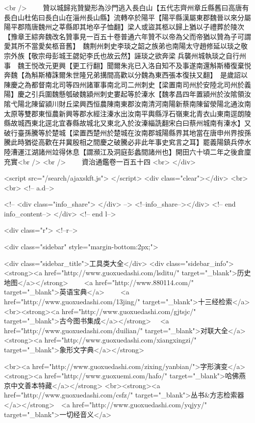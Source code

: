 <br />
　　贊以城歸兆贊變形為沙門逃入長白山【五代志齊州章丘縣舊曰高唐有長白山杜佑曰長白山在淄州長山縣】流轉卒於陽平【陽平縣漢屬東郡魏晉以來分屬陽平郡隋唐魏州之莘縣即其地卒子恤翻】梁人或盜其柩以歸上猶以子禮葬於陵次【豫章王綜奔魏改名贊事見一百五十卷普通六年贊不以帝為父而帝猶以贊為子可謂愛其所不當愛矣柩音舊】　魏荆州刺史李琰之韶之族弟也南陽太守趙修延以琰之敬宗外族【敬宗母彭城王勰妃李氏也故云然】誣琰之欲奔梁兵襲州城執琰之自行州事　魏王悦改元更興【更工行翻】聞爾朱兆已入洛自知不及事遂南還斛斯椿復棄悦奔魏【為斛斯椿誅爾朱世隆兄弟搆間高歡以分魏為東西張本復扶又翻】　是歲詔以陳慶之為都督南北司等四州諸軍事南北司二州刺史【梁置南司州於安陸北司州於義陽】慶之引兵圍魏懸瓠破魏潁州刺史婁起等於溱水【魏孝昌四年置潁州於汝隂領汝隂弋陽北陳留潁川財丘梁興西恒農陳南東郡汝南清河南陽新蔡南陳留滎陽北通汝南太原等雙郡東恒農新興等郡水經注溱水出汝南平輿縣浮石嶺東北青衣山東南逕朗陵縣故城西東北逕北宜春縣故城北又東北入於汝溱緇詵翻宋白曰蔡州城南有溱水】又破行臺孫騰等於楚城【梁置西楚州於楚城在汝南郡城陽縣界其地當在唐申州界按孫騰此時猶從高歡在幷冀殷相之間慶之破騰必非此年事史䆒言之耳】罷義陽鎮兵停水陸漕運江湖諸州竝得休息【謂瀕江及洞庭彭蠡間諸州也】開田六十頃二年之後倉廩充實<br />
<br />
　　資治通鑑卷一百五十四  <br>
   </div> 

<script src="/search/ajaxskft.js"> </script>
 <div class="clear"></div>
<br>
<br>
 <!-- a.d-->

 <!--
<div class="info_share">
</div> 
-->
 <!--info_share--></div>   <!-- end info_content-->
  </div> <!-- end l-->

<div class="r">   <!--r-->



<div class="sidebar"  style="margin-bottom:2px;">

 
<div class="sidebar_title">工具类大全</div>
<div class="sidebar_info">
<strong><a href="http://www.guoxuedashi.com/lsditu/" target="_blank">历史地图</a></strong>　　
<a href="http://www.880114.com/" target="_blank">英语宝典</a>　　
<a href="http://www.guoxuedashi.com/13jing/" target="_blank">十三经检索</a>　
<br><strong><a href="http://www.guoxuedashi.com/gjtsjc/" target="_blank">古今图书集成</a></strong>　
<a href="http://www.guoxuedashi.com/duilian/" target="_blank">对联大全</a>　<strong><a href="http://www.guoxuedashi.com/xiangxingzi/" target="_blank">象形文字典</a></strong>　

<br><a href="http://www.guoxuedashi.com/zixing/yanbian/">字形演变</a>　　<strong><a href="http://www.guoxuemi.com/hafo/" target="_blank">哈佛燕京中文善本特藏</a></strong>
<br><strong><a href="http://www.guoxuedashi.com/csfz/" target="_blank">丛书&方志检索器</a></strong>　<a href="http://www.guoxuedashi.com/yqjyy/" target="_blank">一切经音义</a>　　

